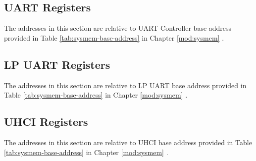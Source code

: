 \documentclass[main\_\_EN.tex]{subfiles}
\begin{document}
\subsection{UART Registers}

The addresses in this section are relative to UART Controller base address provided in Table \ref{tab:sysmem-base-address} in Chapter \ref{mod:sysmem} \textit{}.



\subsection{LP UART Registers}

The addresses in this section are relative to LP UART base address provided in Table \ref{tab:sysmem-base-address} in Chapter \ref{mod:sysmem} \textit{}.





\subsection{UHCI Registers}

The addresses in this section are relative to UHCI base address provided in Table \ref{tab:sysmem-base-address} in Chapter \ref{mod:sysmem} \textit{}.


\end{document}
